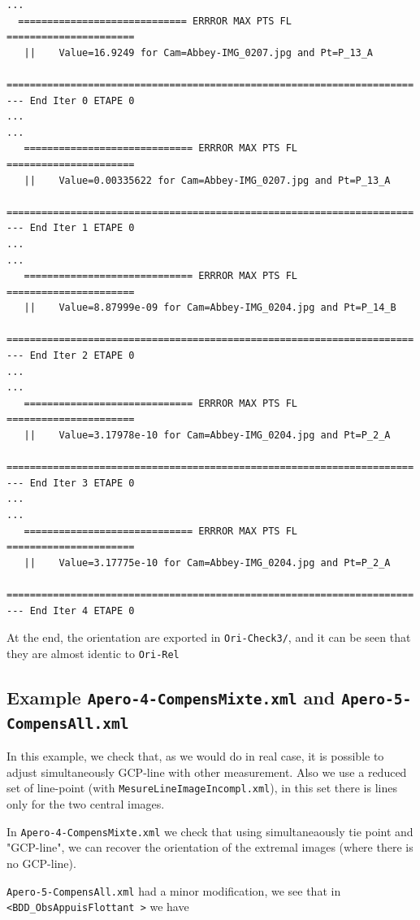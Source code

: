 \begin{verbatim}
...
  ============================= ERRROR MAX PTS FL ======================
   ||    Value=16.9249 for Cam=Abbey-IMG_0207.jpg and Pt=P_13_A
   ======================================================================
--- End Iter 0 ETAPE 0
...
...
   ============================= ERRROR MAX PTS FL ======================
   ||    Value=0.00335622 for Cam=Abbey-IMG_0207.jpg and Pt=P_13_A
   ======================================================================
--- End Iter 1 ETAPE 0
...
...
   ============================= ERRROR MAX PTS FL ======================
   ||    Value=8.87999e-09 for Cam=Abbey-IMG_0204.jpg and Pt=P_14_B
   ======================================================================
--- End Iter 2 ETAPE 0
...
...
   ============================= ERRROR MAX PTS FL ======================
   ||    Value=3.17978e-10 for Cam=Abbey-IMG_0204.jpg and Pt=P_2_A
   ======================================================================
--- End Iter 3 ETAPE 0
...
...
   ============================= ERRROR MAX PTS FL ======================
   ||    Value=3.17775e-10 for Cam=Abbey-IMG_0204.jpg and Pt=P_2_A
   ======================================================================
--- End Iter 4 ETAPE 0

\end{verbatim}

At the end, the orientation are exported in {\tt Ori-Check3/}, and it can be seen that they are almost identic to {\tt Ori-Rel}



\subsection{Example {\tt Apero-4-CompensMixte.xml} and  {\tt  Apero-5-CompensAll.xml}}

In this example, we check that, as we would do in real case, it is possible to adjust simultaneously GCP-line with
other measurement. Also we use a reduced set of line-point (with {\tt MesureLineImageIncompl.xml}), in this set
there is lines only for the two central images. 

In {\tt Apero-4-CompensMixte.xml} we check that using simultaneaously tie point and "GCP-line", we can recover the orientation
of the extremal images (where there is no GCP-line).

{\tt  Apero-5-CompensAll.xml} had a minor modification, we see that in {\tt <BDD\_ObsAppuisFlottant >} we have

